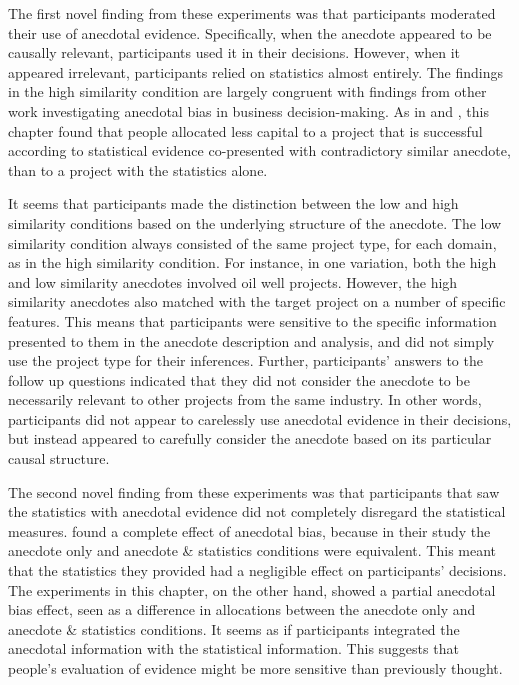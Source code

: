 \documentclass[a4paper, nobind, dvipsnames]{templates/ociamthesis}
\theoremstyle{definition}
\theoremstyle{definition}
\theoremstyle{definition}
\theoremstyle{definition}
\theoremstyle{remark}
\begin{document}
The first novel finding from these experiments was that participants moderated
their use of anecdotal evidence. Specifically, when the anecdote appeared to be
causally relevant, participants used it in their decisions. However, when it
appeared irrelevant, participants relied on statistics almost entirely. The
findings in the high similarity condition are largely congruent with findings
from other work investigating anecdotal bias in business decision-making. As in
\textcite{wainberg2013} and \textcite{wainberg2018}, this chapter found that people allocated less
capital to a project that is successful according to statistical evidence
co-presented with contradictory similar anecdote, than to a project with the
statistics alone.

It seems that participants made the distinction between the low and high
similarity conditions based on the underlying structure of the anecdote. The low
similarity condition always consisted of the same project type, for each domain,
as in the high similarity condition. For instance, in one variation, both the
high and low similarity anecdotes involved oil well projects. However, the high
similarity anecdotes also matched with the target project on a number of
specific features. This means that participants were sensitive to the specific
information presented to them in the anecdote description and analysis, and did
not simply use the project type for their inferences. Further, participants'
answers to the follow up questions indicated that they did not consider the
anecdote to be necessarily relevant to other projects from the same industry. In
other words, participants did not appear to carelessly use anecdotal evidence in
their decisions, but instead appeared to carefully consider the anecdote based
on its particular causal structure.

The second novel finding from these experiments was that participants that saw
the statistics with anecdotal evidence did not completely disregard the
statistical measures. \textcite{wainberg2013} found a complete effect of anecdotal bias,
because in their study the anecdote only and anecdote \& statistics conditions
were equivalent. This meant that the statistics they provided had a negligible
effect on participants' decisions. The experiments in this chapter, on the other
hand, showed a partial anecdotal bias effect, seen as a difference in
allocations between the anecdote only and anecdote \& statistics conditions. It
seems as if participants integrated the anecdotal information with the
statistical information. This suggests that people's evaluation of evidence
might be more sensitive than previously thought.
\end{document}
